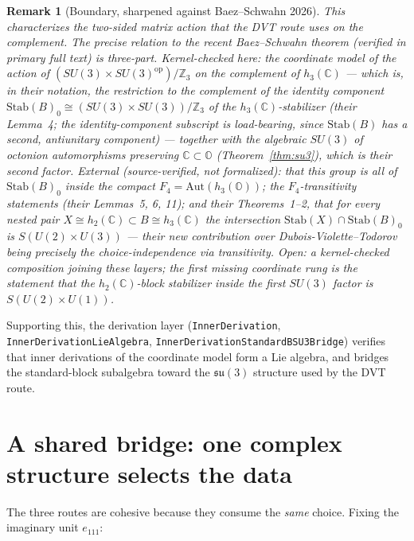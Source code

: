 \documentclass[11pt]{article}
\newcommand{\C}{\mathbb{C}}
\newcommand{\OO}{\mathbb{O}}
\newcommand{\su}{\mathfrak{su}}
\newcommand{\leanname}[1]{\texttt{#1}}
\newtheorem{remark}{Remark}
\begin{document}
\begin{remark}[Boundary, sharpened against Baez--Schwahn 2026]
This characterizes the \emph{two-sided matrix action} that the DVT route
uses on the complement.  The precise relation to the recent
Baez--Schwahn theorem \cite{BaezSchwahn2026} (verified in primary full
text) is three-part.  \emph{Kernel-checked here:} the coordinate model
of the action of $(SU(3)\times SU(3)^{\mathrm{op}})/\mathbb{Z}_3$ on the
complement of $h_3(\C)$ --- which is, in their notation, the restriction
to the complement of the identity component
$\mathrm{Stab}(B)_0 \cong (SU(3)\times SU(3))/\mathbb{Z}_3$ of the
$h_3(\C)$-stabilizer (their Lemma~4; the identity-component subscript is
load-bearing, since $\mathrm{Stab}(B)$ has a second, antiunitary
component) --- together with the algebraic $SU(3)$ of octonion
automorphisms preserving $\C\subset\OO$
(Theorem~\ref{thm:su3}), which is their second factor.  \emph{External
(source-verified, not formalized):} that this group is all of
$\mathrm{Stab}(B)_0$ inside the compact
$F_4 = \mathrm{Aut}(h_3(\OO))$; the $F_4$-transitivity statements
(their Lemmas~5, 6, 11); and their Theorems~1--2, that for every nested
pair $X \cong h_2(\C) \subset B \cong h_3(\C)$ the intersection
$\mathrm{Stab}(X)\cap\mathrm{Stab}(B)_0$ is $S(U(2)\times U(3))$ ---
their new contribution over Dubois-Violette--Todorov being precisely the
choice-independence via transitivity.  \emph{Open:} a kernel-checked
composition joining these layers; the first missing coordinate rung is
the statement that the $h_2(\C)$-block stabilizer inside the first
$SU(3)$ factor is $S(U(2)\times U(1))$.
\end{remark}

Supporting this, the derivation layer
(\leanname{InnerDerivation},
\leanname{InnerDerivationLieAlgebra},
\leanname{InnerDerivationStandardBSU3Bridge}) verifies that inner
derivations of the coordinate model form a Lie algebra, and bridges the
standard-block subalgebra toward the $\su(3)$ structure used by the DVT
route.

\section{A shared bridge: one complex structure selects the data}
\label{sec:bridge}

The three routes are cohesive because they consume the \emph{same}
choice.  Fixing the imaginary unit $e_{111}$:
\end{document}
